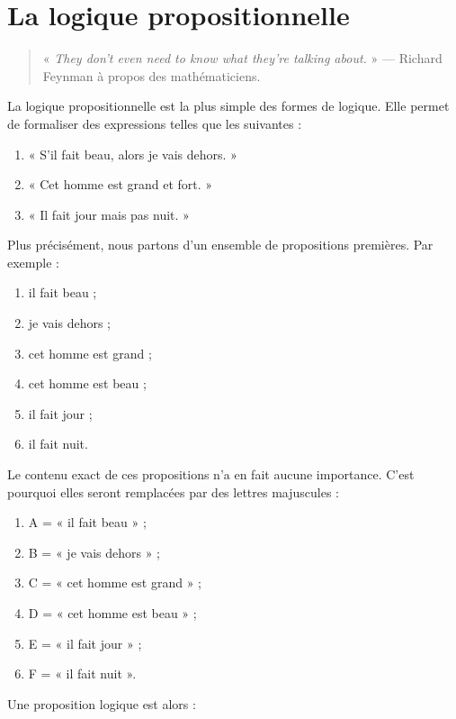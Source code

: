 
\chapter{La logique propositionnelle}

\begin{quote}
« \textit{\foreignlanguage{english}{They don't even need to know what they're
talking about.}} » --- Richard Feynman à propos des mathématiciens.
\end{quote}

La logique propositionnelle est la plus simple des formes de logique. Elle
permet de formaliser des expressions telles que les suivantes :

\begin{enumerate}
\item « S’il fait beau, alors je vais dehors. »
\item « Cet homme est grand et fort. »
\item « Il fait jour mais pas nuit. »
\end{enumerate}

Plus précisément, nous partons d’un ensemble de propositions
premières. Par exemple :

\begin{enumerate}
\item il fait beau ;
\item je vais dehors ;
\item cet homme est grand ;
\item cet homme est beau ;
\item il fait jour ;
\item il fait nuit.
\end{enumerate}

Le contenu exact de ces propositions n’a en fait aucune importance. C’est
pourquoi elles seront remplacées par des lettres majuscules :

\begin{enumerate}
\item A = « il fait beau » ;
\item B = « je vais dehors » ;
\item C = « cet homme est grand » ;
\item D = « cet homme est beau » ;
\item E = « il fait jour » ;
\item F = « il fait nuit ».
\end{enumerate}

Une proposition logique est alors :

